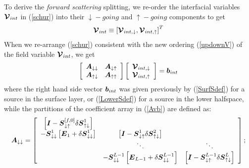  To derive the {\em forward scattering\/} splitting, we re-order the interfacial variables 
${\mbox{\boldmath$\cal V$\unboldmath}}_{{int}}$ in (\ref{schur}) into their $\downarrow\!\!-going$ and 
$\uparrow\!\!-going$ components to get
\begin{equation} \label{updownV}
{\mbox{\boldmath$\cal V$\unboldmath}}_{{int}}\equiv \left[{\mbox{\boldmath$\cal V$\unboldmath}}_{{int, \downarrow}}, {\mbox{\boldmath$\cal V$\unboldmath}}_{{int, \uparrow}}\right]^{T}
\end{equation}
When we re-arrange (\ref{schur}) consistent with the new ordering 
(\ref{updownV}) of the field variable ${\mbox{\boldmath$\cal V$\unboldmath}}_{{int}}$, we get
\begin{equation} \label{Avb}
\left[{\begin{array}{cc}
{\mbox{\boldmath$\mit A$\unboldmath}}_{ \downarrow \downarrow }&{\mbox{\boldmath$\mit A$\unboldmath}}_{ \downarrow \uparrow }\\ 
{\mbox{\boldmath$\mit A$\unboldmath}}_{ \uparrow \downarrow }&{\mbox{\boldmath$\mit A$\unboldmath}}_{ \uparrow \uparrow }\end{array}}\right]
\left[{\begin{array}{c}{\mbox{\boldmath$\cal V$\unboldmath}}_{int, \downarrow }\\ 
{\mbox{\boldmath$\cal V$\unboldmath}}_{int, \uparrow }\end{array}}\right]={\mbox{\boldmath$\mit b$\unboldmath}}_{int}
\end{equation} 
where the right hand side vector ${\mbox{\boldmath$\mit b$\unboldmath}}_{int}$ was given previously by 
(\ref{SurfSdef}) for a source in the surface layer, or (\ref{LowerSdef}) for a source in 
the lower halfspace, while the partitions of the coefficient array in 
(\ref{Avb}) are defined as:
\[
{\mbox{\boldmath$\mit A$\unboldmath}}_{ \downarrow \downarrow 
}=\left[{\begin{array}{ccc}\left[{{\mbox{\boldmath$\mit I$\unboldmath}}-{\mbox{\boldmath$\mit S$\unboldmath}}_{ \downarrow \uparrow 
}^{[f,0]} {\mit \delta} {  \mbox{\boldmath$\mit S$\unboldmath}}_{\uparrow \downarrow }^{  
1}}\right]&&\\ -{\mbox{\boldmath$\mit S$\unboldmath}}_{ \downarrow \downarrow }^{1} \left[{\mbox{\boldmath$\mit E$\unboldmath}}_{1}+ {\mit \delta} {  
\mbox{\boldmath$\mit S$\unboldmath}}_{\downarrow\downarrow  }^{  1}\right]&\left[{  {\mbox{\boldmath$\mit I$\unboldmath}}-{\mbox{\boldmath$\mit S$\unboldmath}}_{ 
\downarrow \uparrow }^{1} {\mit \delta} {  \mbox{\boldmath$\mit S$\unboldmath}}_{\uparrow \downarrow 
}^{  2}}\right]&\\ &\ddots  &\ddots\\ &-{\mbox{\boldmath$\mit S$\unboldmath}}_{ \downarrow \downarrow 
}^{L-1} \left[{\mbox{\boldmath$\mit E$\unboldmath}}_{L-1}+{\mit \delta} {  \mbox{\boldmath$\mit S$\unboldmath}}_{ \downarrow \downarrow }^{  L-1}\right]&\left[{  {\mbox{\boldmath$\mit I$\unboldmath}}-{\mbox{\boldmath$\mit S$\unboldmath}}_{ \downarrow \uparrow }^{L-1} {\mit \delta} { 
 \mbox{\boldmath$\mit S$\unboldmath}}_{\uparrow \downarrow }^{  L}}\right]\end{array}}\right];
\] 



